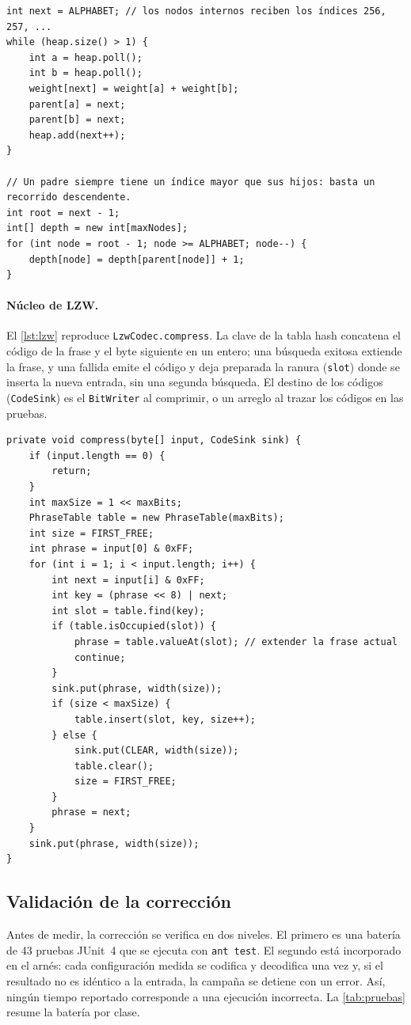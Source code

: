 \begin{lstlisting}[caption={Fusión de nodos y cálculo de profundidades en \texttt{HuffmanCodec.codeLengths}.},label={lst:huffman}]
int next = ALPHABET; // los nodos internos reciben los índices 256, 257, ...
while (heap.size() > 1) {
    int a = heap.poll();
    int b = heap.poll();
    weight[next] = weight[a] + weight[b];
    parent[a] = next;
    parent[b] = next;
    heap.add(next++);
}

// Un padre siempre tiene un índice mayor que sus hijos: basta un recorrido descendente.
int root = next - 1;
int[] depth = new int[maxNodes];
for (int node = root - 1; node >= ALPHABET; node--) {
    depth[node] = depth[parent[node]] + 1;
}
\end{lstlisting}

\paragraph{Núcleo de LZW.} El \cref{lst:lzw} reproduce \texttt{LzwCodec.compress}. La clave de
la tabla hash concatena el código de la frase y el byte siguiente en un entero; una búsqueda
exitosa extiende la frase, y una fallida emite el código y deja preparada la ranura
(\texttt{slot}) donde se inserta la nueva entrada, sin una segunda búsqueda. El destino de los
códigos (\texttt{CodeSink}) es el \texttt{BitWriter} al comprimir, o un arreglo al trazar los
códigos en las pruebas.

\begin{lstlisting}[caption={Bucle de codificación de \texttt{LzwCodec.compress}.},label={lst:lzw}]
private void compress(byte[] input, CodeSink sink) {
    if (input.length == 0) {
        return;
    }
    int maxSize = 1 << maxBits;
    PhraseTable table = new PhraseTable(maxBits);
    int size = FIRST_FREE;
    int phrase = input[0] & 0xFF;
    for (int i = 1; i < input.length; i++) {
        int next = input[i] & 0xFF;
        int key = (phrase << 8) | next;
        int slot = table.find(key);
        if (table.isOccupied(slot)) {
            phrase = table.valueAt(slot); // extender la frase actual
            continue;
        }
        sink.put(phrase, width(size));
        if (size < maxSize) {
            table.insert(slot, key, size++);
        } else {
            sink.put(CLEAR, width(size));
            table.clear();
            size = FIRST_FREE;
        }
        phrase = next;
    }
    sink.put(phrase, width(size));
}
\end{lstlisting}

\subsection{Validación de la corrección}
\label{sec:pruebas}
Antes de medir, la corrección se verifica en dos niveles. El primero es una batería de 43
pruebas JUnit~4 que se ejecuta con \texttt{ant test}. El segundo está incorporado en el arnés:
cada configuración medida se codifica y decodifica una vez y, si el resultado no es idéntico
a la entrada, la campaña se detiene con un error. Así, ningún tiempo reportado corresponde a
una ejecución incorrecta. La \cref{tab:pruebas} resume la batería por clase.

